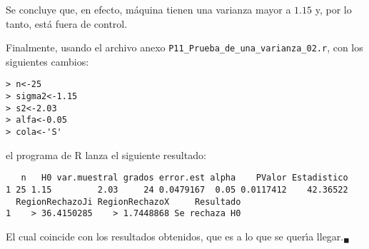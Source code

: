 \begin{solucion}
 \begin{conclusion}
  Se concluye que, en efecto, m\'aquina tienen una varianza mayor
  a $1.15$ y, por lo tanto, est\'a fuera de control.
 \end{conclusion}
 
 Finalmente, usando el archivo anexo \texttt{P11\_Prueba\_de\_una\_varianza\_02.r}, con los siguientes cambios:
 \begin{verbatim}
> n<-25
> sigma2<-1.15
> s2<-2.03
> alfa<-0.05
> cola<-'S'
 \end{verbatim}
 \vspace{-0.5cm}
 el programa de R lanza el siguiente resultado:
 \begin{verbatim}
   n   H0 var.muestral grados error.est alpha    PValor Estadistico
1 25 1.15         2.03     24 0.0479167  0.05 0.0117412    42.36522
  RegionRechazoJi RegionRechazoX     Resultado
1    > 36.4150285    > 1.7448868 Se rechaza H0
 \end{verbatim}
 \vspace{-0.5cm}
 El cual coincide con los resultados obtenidos,
 que es a lo que se quer\'{\i}a llegar.${}_{\blacksquare}$
\end{solucion}
